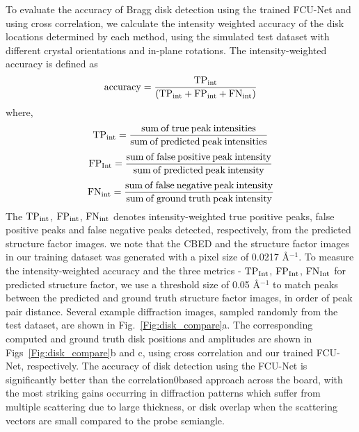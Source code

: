 \documentclass[%
 reprint,
superscriptaddress,
 amsmath,
 amssymb,
 prl,
]{revtex4-2}
\begin{document}
To evaluate the accuracy of Bragg disk detection using the trained FCU-Net and using cross correlation, we calculate the intensity weighted accuracy of the disk locations determined by each method, using the simulated test dataset with different crystal orientations and in-plane rotations. The intensity-weighted accuracy is defined as
\begin{equation}
    \rm{accuracy} =
    \frac{TP_{int}}
    {(TP_{int} + FP_{int} + FN_{int})}
\end{equation}
where, 
\begin{equation*} 
    \rm{TP}_{int} =
    \frac{\rm{sum \: of \: true \: peak \: intensities}}
    {\rm{sum \: of \: predicted \: peak \: intensities}} 
\end{equation*}
\begin{equation*} 
    \rm{FP}_{Int} = 
    \frac{\rm{sum \: of \: false \: positive \: peak \: intensity}}
    {\rm{sum \: of \: predicted \: peak \: intensity}}  
\end{equation*}
\begin{equation*} 
    \rm{FN}_{int} =
    \frac{\rm{sum \: of \: false \: negative \: peak \: intensity}}
    {\rm{sum \: of \: ground \: truth \: peak \: intensity}}
\end{equation*}
The $\rm{TP}_{int}$, $\rm{FP}_{int}$, $\rm{FN}_{int}$ denotes intensity-weighted true positive peaks, false positive peaks and false negative peaks detected, respectively, from the predicted structure factor images. we note that the CBED and the structure factor images in our training dataset was generated with a pixel size of 0.0217 \AA{}$^{-1}$. To measure the intensity-weighted accuracy and the three metrics - $\rm{TP}_{Int}$, $\rm{FP}_{Int}$, $\rm{FN}_{Int}$ for predicted structure factor, we use a threshold size of 0.05 \AA{}$^{-1}$ to match peaks between the predicted and ground truth structure factor images, in order of peak pair distance. Several example diffraction images, sampled randomly from the test dataset, are shown in Fig.~\ref{Fig:disk_compare}a. The corresponding computed and ground truth disk positions and amplitudes are shown in Figs~\ref{Fig:disk_compare}b and c, using cross correlation and our trained FCU-Net, respectively. The accuracy of disk detection using the FCU-Net is significantly better than the correlation0based approach across the board, with the most striking gains occurring in diffraction patterns which suffer from multiple scattering due to large thickness, or disk overlap when the scattering vectors are small compared to the probe semiangle. 
\end{document}
